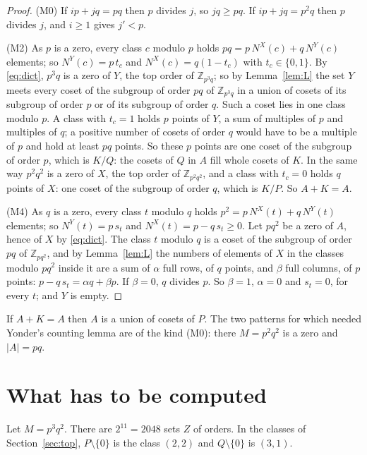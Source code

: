 \documentclass[11pt,a4paper]{amsart}
\theoremstyle{definition}
\theoremstyle{remark}
\newcommand{\Z}{\mathbb{Z}}
\begin{document}
\begin{proof}
(M0) If $ip+jq=pq$ then $p$ divides $j$, so $jq\ge pq$. If $ip+jq=p^2q$ then $p$ divides $j$, and $i\ge1$ gives
$j'<p$.

(M2) As $p$ is a zero, every class $c$ modulo $p$ holds $pq=p\,N^X(c)+q\,N^Y(c)$ elements; so $N^Y(c)=p\,t_c$
and $N^X(c)=q(1-t_c)$ with $t_c\in\{0,1\}$. By \eqref{eq:dict}, $p^3q$ is a zero of $Y$, the top order of
$\Z_{p^3q}$; so by Lemma~\ref{lem:L} the set $Y$ meets every coset of the subgroup of order $pq$ of $\Z_{p^3q}$
in a union of cosets of its subgroup of order $p$ or of its subgroup of order $q$. Such a coset lies in one
class modulo $p$. A class with $t_c=1$ holds $p$ points of $Y$, a sum of multiples of $p$ and multiples of $q$;
a positive number of cosets of order $q$ would have to be a multiple of $p$ and hold at least $pq$ points. So
these $p$ points are one coset of the subgroup of order $p$, which is $K/Q$: the cosets of $Q$ in $A$ fill whole
cosets of $K$. In the same way $p^2q^2$ is a zero of $X$, the top order of $\Z_{p^2q^2}$, and a class with
$t_c=0$ holds $q$ points of $X$: one coset of the subgroup of order $q$, which is $K/P$. So $A+K=A$.

(M4) As $q$ is a zero, every class $t$ modulo $q$ holds $p^2=p\,N^X(t)+q\,N^Y(t)$ elements; so $N^Y(t)=p\,s_t$
and $N^X(t)=p-q\,s_t\ge0$. Let $pq^2$ be a zero of $A$, hence of $X$ by \eqref{eq:dict}. The class $t$ modulo
$q$ is a coset of the subgroup of order $pq$ of $\Z_{pq^2}$, and by Lemma~\ref{lem:L} the numbers of elements of
$X$ in the classes modulo $pq^2$ inside it are a sum of $\alpha$ full rows, of $q$ points, and $\beta$ full
columns, of $p$ points: $p-q\,s_t=\alpha q+\beta p$. If $\beta=0$, $q$ divides $p$. So $\beta=1$, $\alpha=0$ and
$s_t=0$, for every $t$; and $Y$ is empty.
\end{proof}

If $A+K=A$ then $A$ is a union of cosets of $P$. The two patterns for which \cite{N2} needed Yonder's counting
lemma are of the kind (M0): there $M=p^2q^2$ is a zero and $|A|=pq$.

\section{What has to be computed}\label{sec:sort}

Let $M=p^3q^2$. There are $2^{11}=2048$ sets $Z$ of orders. In the classes of Section~\ref{sec:top},
$P\setminus\{0\}$ is the class $(2,2)$ and $Q\setminus\{0\}$ is $(3,1)$.
\end{document}
